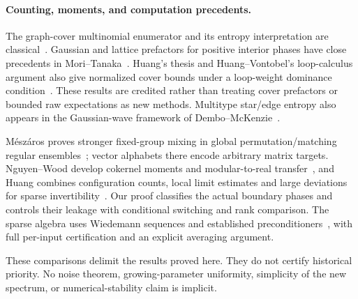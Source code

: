 \paragraph{Counting, moments, and computation precedents.}
The graph-cover multinomial enumerator and its entropy interpretation
are classical~\cite{Vontobel}. Gaussian and lattice prefactors for
positive interior phases have close precedents in
Mori--Tanaka~\cite{MoriTanaka,MoriTanakaCentral}.
Huang's thesis and Huang--Vontobel's loop-calculus argument also give
normalized cover bounds under a loop-weight dominance
condition~\cite{HuangThesis,HV}.
These results are credited rather than treating cover prefactors or
bounded raw expectations as new methods. Multitype star/edge entropy
also appears in the Gaussian-wave framework of
Dembo--McKenzie~\cite{DM}.

M\'esz\'aros proves stronger fixed-group mixing in global
permutation/matching regular ensembles~\cite{Meszaros}; vector
alphabets there encode arbitrary matrix targets.
Nguyen--Wood develop cokernel moments and modular-to-real
transfer~\cite{NW}, and Huang combines configuration counts, local
limit estimates and large deviations for sparse
invertibility~\cite{Huang}. Our proof classifies the actual boundary
phases and controls their leakage with conditional switching and
rank comparison. The sparse algebra uses Wiedemann sequences and
established preconditioners~\cite{Wiedemann,Chen}, with full per-input
certification and an explicit averaging argument.

These comparisons delimit the results proved here. They do not
certify historical priority. No noise theorem, growing-parameter
uniformity, simplicity of the new spectrum, or numerical-stability
claim is implicit.

